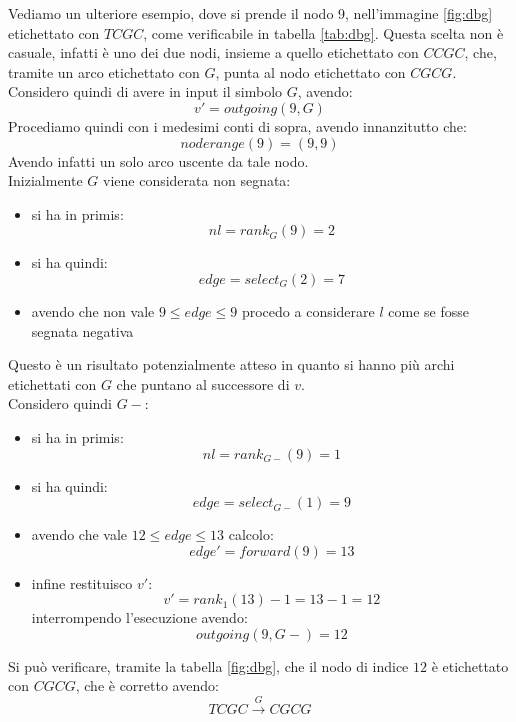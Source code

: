 \documentclass[a4paper,12pt, oneside]{book}
\begin{document}
\begin{esempio}
  Vediamo un ulteriore esempio, dove si prende il nodo 9, nell'immagine
  \ref{fig:dbg} etichettato con $TCGC$, come verificabile in tabella
  \ref{tab:dbg}. Questa scelta non è casuale, infatti è uno dei due nodi,
  insieme a quello etichettato con $CCGC$, che, tramite un arco etichettato con
  $G$, punta al nodo etichettato con $CGCG$.\\
  Considero quindi di avere in input il simbolo $G$, avendo:
  \[v'=outgoing(9, G)\]
  Procediamo quindi con i medesimi conti di sopra, avendo innanzitutto che:
  \[noderange(9)= (9,9)\]
  Avendo infatti un solo arco uscente da tale nodo.\\
  Inizialmente $G$ viene considerata non segnata:
  \begin{itemize}
    \item si ha in primis:
    \[nl=rank_G(9)=2\]
    \item si ha quindi:
    \[edge = select_G(2)=7\]
    \item avendo che non vale $9\leq edge \leq 9$ procedo a considerare
    $l$ come se fosse segnata negativa
  \end{itemize}
  Questo è un risultato potenzialmente atteso in quanto si hanno più archi
  etichettati con $G$ che puntano al successore di $v$.\\
  Considero quindi $G-$:
  \begin{itemize}
    \item si ha in primis:
    \[nl=rank_{G-}(9)=1\]
    \item si ha quindi:
    \[edge = select_{G-}(1)=9\]
    \item avendo che vale $12\leq edge \leq 13$ calcolo:
    \[edge' = forward(9)=13\]
    \item infine restituisco $v'$:
    \[v'=rank_1(13)-1= 13-1 = 12\]
    interrompendo l'esecuzione avendo:
    \[outgoing(9,G-)=12\]
  \end{itemize}
  Si può verificare, tramite la tabella \ref{fig:dbg}, che il nodo di indice
  $12$ è etichettato con $CGCG$, che è corretto avendo:
  \[TCGC\stackrel{G}{\to}CGCG\]
\end{esempio}
\end{document}
